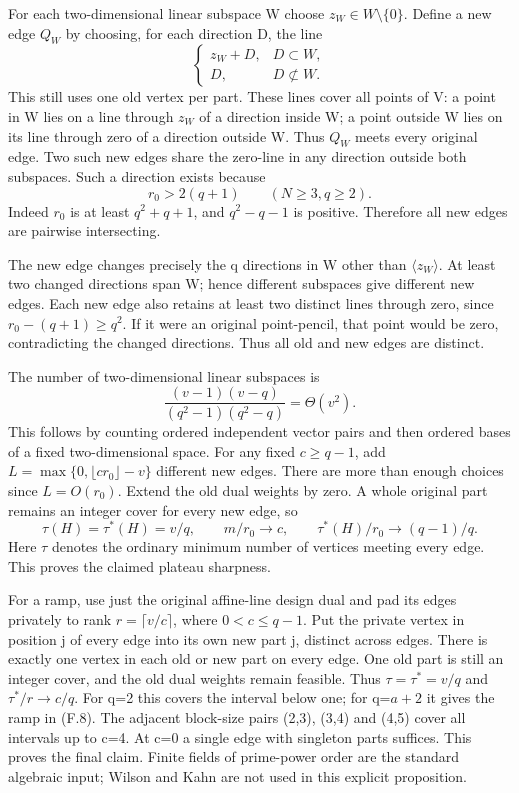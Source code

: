 \documentclass[
  11pt,
]{article}
\begin{document}
For each two-dimensional linear subspace W choose
\(z_W\in W\setminus\{0\}\). Define a new edge \(Q_W\) by choosing, for
each direction D, the line \[
 \begin{cases}
      z_W+D,&D\subset W,\\
      D,&D\not\subset W.
 \end{cases}                                                \tag{F.14a}
\] This still uses one old vertex per part. These lines cover all points
of V: a point in W lies on a line through \(z_W\) of a direction inside
W; a point outside W lies on its line through zero of a direction
outside W. Thus \(Q_W\) meets every original edge. Two such new edges
share the zero-line in any direction outside both subspaces. Such a
direction exists because \[
             r_0>2(q+1)\qquad(N\ge3,q\ge2).
\] Indeed \(r_0\) is at least \(q^2+q+1\), and \(q^2-q-1\) is positive.
Therefore all new edges are pairwise intersecting.

The new edge changes precisely the q directions in W other than
\(\langle z_W\rangle\). At least two changed directions span W; hence
different subspaces give different new edges. Each new edge also retains
at least two distinct lines through zero, since \(r_0-(q+1)\ge q^2\). If
it were an original point-pencil, that point would be zero,
contradicting the changed directions. Thus all old and new edges are
distinct.

The number of two-dimensional linear subspaces is \[
          \frac{(v-1)(v-q)}{(q^2-1)(q^2-q)}=\Theta(v^2).
                                                               \tag{F.14b}
\] This follows by counting ordered independent vector pairs and then
ordered bases of a fixed two-dimensional space. For any fixed
\(c\ge q-1\), add \(L=\max\{0,\lfloor cr_0\rfloor-v\}\) different new
edges. There are more than enough choices since \(L=O(r_0)\). Extend the
old dual weights by zero. A whole original part remains an integer cover
for every new edge, so \[
                  \tau(H)=\tau^*(H)=v/q,
       \qquad m/r_0\to c,\qquad \tau^*(H)/r_0\to(q-1)/q.
                                                               \tag{F.14c}
\] Here \(\tau\) denotes the ordinary minimum number of vertices meeting
every edge. This proves the claimed plateau sharpness.

For a ramp, use just the original affine-line design dual and pad its
edges privately to rank \(r=\lceil v/c\rceil\), where \(0<c\le q-1\).
Put the private vertex in position j of every edge into its own new part
j, distinct across edges. There is exactly one vertex in each old or new
part on every edge. One old part is still an integer cover, and the old
dual weights remain feasible. Thus \(\tau=\tau^*=v/q\) and
\(\tau^*/r\to c/q\). For q=2 this covers the interval below one; for
q=\(a+2\) it gives the ramp in (F.8). The adjacent block-size pairs
(2,3), (3,4) and (4,5) cover all intervals up to c=4. At c=0 a single
edge with singleton parts suffices. This proves the final claim. Finite
fields of prime-power order are the standard algebraic input; Wilson and
Kahn are not used in this explicit proposition.
\end{document}
